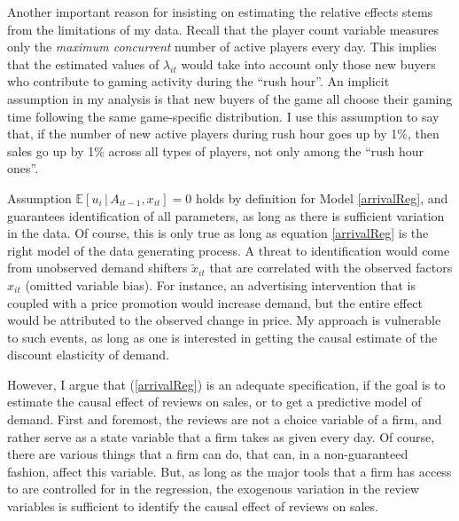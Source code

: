 \documentclass[12pt,pagebackref]{article}
\begin{document}
Another important reason for insisting on estimating the relative
effects stems from the limitations of my data. Recall that the player
count variable measures only the \emph{maximum concurrent} number of
active players every day. This implies that the estimated values of
\(\lambda_{it}\) would take into account only those new buyers who
contribute to gaming activity during the ``rush hour''. An implicit
assumption in my analysis is that new buyers of the game all choose
their gaming time following the same game-specific distribution. I use
this assumption to say that, if the number of new active players during
rush hour goes up by 1\%, then sales go up by 1\% across all types of
players, not only among the ``rush hour ones''.

Assumption \(\mathbb{E}\left[u_i\,|\,A_{it-1}, x_{it} \right] = 0\)
holds by definition for Model \ref{arrivalReg}, and guarantees
identification of all parameters, as long as there is sufficient
variation in the data. Of course, this is only true as long as equation
\ref{arrivalReg} is the right model of the data generating process. A
threat to identification would come from unobserved demand shifters
\(\tilde x_{it}\) that are correlated with the observed factors
\(x_{it}\) (omitted variable bias). For instance, an advertising
intervention that is coupled with a price promotion would increase
demand, but the entire effect would be attributed to the observed change
in price. My approach is vulnerable to such events, as long as one is
interested in getting the causal estimate of the discount elasticity of
demand.

However, I argue that (\ref{arrivalReg}) is an adequate specification,
if the goal is to estimate the causal effect of reviews on sales, or to
get a predictive model of demand. First and foremost, the reviews are
not a choice variable of a firm, and rather serve as a state variable
that a firm takes as given every day. Of course, there are various
things that a firm can do, that can, in a non-guaranteed fashion, affect
this variable. But, as long as the major tools that a firm has access to
are controlled for in the regression, the exogenous variation in the
review variables is sufficient to identify the causal effect of reviews
on sales.
\end{document}
